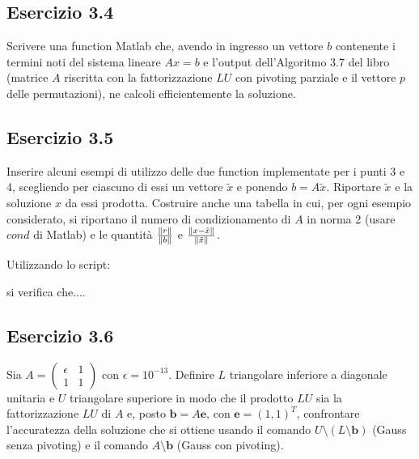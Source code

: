 



	\subsection{Esercizio 3.4}

Scrivere una function Matlab che, avendo in ingresso un vettore $b$ contenente i termini noti del sistema lineare $Ax = b$ e l’output dell’Algoritmo 3.7 del libro (matrice $A$ riscritta con la fattorizzazione $LU$ con pivoting parziale e il vettore $p$ delle permutazioni), ne calcoli efficientemente la soluzione.




	\subsection{Esercizio 3.5}

 Inserire alcuni esempi di utilizzo delle due function implementate per i punti 3 e 4, scegliendo per ciascuno di essi un vettore $\tilde{x}$ e ponendo $b = A\tilde{x}$. Riportare $\tilde{x}$ e la soluzione $x$ da essi prodotta. Costruire anche una tabella in cui, per ogni esempio considerato, si riportano il numero di condizionamento di $A$ in norma 2 (usare $cond$ di Matlab) e le quantità $\frac{\norm{r}}{\norm{b}}$ e $\frac{\norm{x-\tilde{x}}}{\norm{\tilde{x}}}$.

Utilizzando lo script:



si verifica che....


	\subsection{Esercizio 3.6}

Sia $A = \begin{pmatrix} \epsilon & 1 \\ 1 & 1  \end{pmatrix}$ con $\epsilon = 10^{-13}$. Definire $L$ triangolare inferiore a diagonale unitaria e $U$ triangolare superiore in modo che il prodotto $LU$ sia la fattorizzazione $LU$ di $A$ e, posto $\mathbf{b} = A\mathbf{e}$, con $\mathbf{e} = (1, 1)^T$, confrontare l'accuratezza della soluzione che si ottiene usando il comando $U\setminus(L\setminus \mathbf{b})$ (Gauss senza pivoting) e il comando $A\setminus \mathbf{b}$ (Gauss con pivoting).

